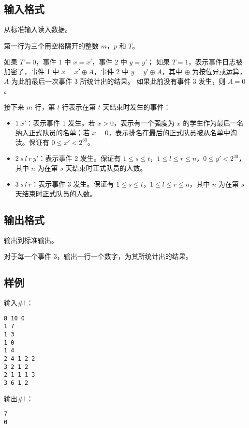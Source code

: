 \subsection*{输入格式}

从标准输入读入数据。

第一行为三个用空格隔开的整数 $m$，$p$ 和 $T$。

如果 $T = 0$，事件 1 中 $x = x'$，事件 2 中 $y = y'$；
如果 $T = 1$，表示事件日志被加密了，事件 1 中 $x = x' \oplus A$，事件 2 中 $y = y' \oplus A$，其中 $\oplus$ 为按位异或运算，$A$ 为此前最后一次事件 3 所统计出的结果。
如果此前没有事件 3 发生，则 $A = 0$。

接下来 $m$ 行，第 $t$ 行表示在第 $t$ 天结束时发生的事件：

\begin{itemize}
    \item $1 \ x'$：表示事件 1 发生。若 $x > 0$，表示有一个强度为 $x$ 的学生作为最后一名纳入正式队员的名单；若 $x = 0$，表示排名在最后的正式队员被从名单中淘汰。保证有 $0 \le x' < 2^{30}$。
    \item $2 \ s \ l \ r \ y'$：表示事件 2 发生。保证有 $1 \le s \le t$，$1 \le l \le r \le n$，$0 \le y' < 2^{30}$，其中 $n$ 为在第 $s$ 天结束时正式队员的人数。
    \item $3 \ s \ l \ r$：表示事件 3 发生。保证有 $1 \le s \le t$，$1 \le l \le r \le n$，其中 $n$ 为在第 $s$ 天结束时正式队员的人数。
\end{itemize}

\subsection*{输出格式}

输出到标准输出。

对于每一个事件 3，输出一行一个数字，为其所统计出的结果。

\subsection*{样例}

输入\#1：

\begin{lstlisting}
8 10 0
1 7
1 3
1 0
1 4
2 4 1 2 2
3 2 1 2
2 1 1 1 3
3 6 1 2
\end{lstlisting}

输出\#1：

\begin{lstlisting}
7
0
\end{lstlisting}

